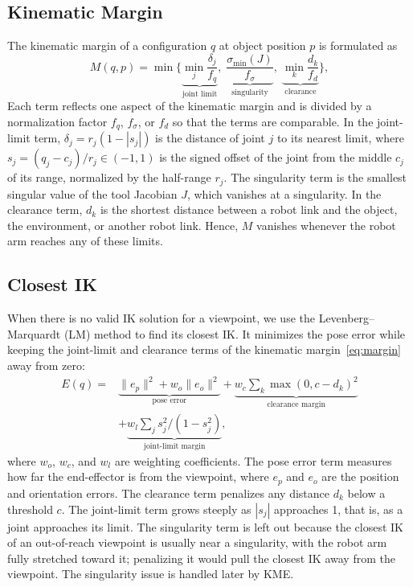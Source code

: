 \documentclass[letterpaper, journal, twoside]{IEEEtran}
\begin{document}
\subsection{Kinematic Margin}
\label{sec:margin}
The kinematic margin of a configuration $q$ at object position $p$ is formulated as
\begin{equation}
M(q, p) = \min\Big\{ \underbrace{\min_j \frac{\delta_j}{f_q}}_{\text{joint limit}},\; \underbrace{\frac{\sigma_{\min}(J)}{f_\sigma}}_{\text{singularity}},\; \underbrace{\min_k \frac{d_k}{f_d}}_{\text{clearance}} \Big\},
\label{eq:margin}
\end{equation}
Each term reflects one aspect of the kinematic margin and is divided by a normalization factor $f_q$, $f_\sigma$, or $f_d$ so that the terms are comparable. In the joint-limit term, $\delta_j = r_j(1 - |s_j|)$ is the distance of joint $j$ to its nearest limit, where $s_j = (q_j - c_j)/r_j \in (-1, 1)$ is the signed offset of the joint from the middle $c_j$ of its range, normalized by the half-range $r_j$. The singularity term is the smallest singular value of the tool Jacobian $J$, which vanishes at a singularity. In the clearance term, $d_k$ is the shortest distance between a robot link and the object, the environment, or another robot link. Hence, $M$ vanishes whenever the robot arm reaches any of these limits.

\subsection{Closest IK}
\label{sec:closest}
When there is no valid IK solution for a viewpoint, we use the Levenberg--Marquardt (LM) method to find its closest IK. It minimizes the pose error while keeping the joint-limit and clearance terms of the kinematic margin~\eqref{eq:margin} away from zero:
\begin{equation}
\begin{split}
E(q) = {}&\underbrace{\lVert e_p \rVert^2 + w_o \lVert e_o \rVert^2}_{\text{pose error}}
+ \underbrace{w_c \textstyle\sum_k \max(0, c - d_k)^2}_{\text{clearance margin}} \\
&+ \underbrace{w_l \textstyle\sum_j s_j^2 / (1 - s_j^2)}_{\text{joint-limit margin}},
\end{split}
\label{eq:closest}
\end{equation}
where $w_o$, $w_c$, and $w_l$ are weighting coefficients. The pose error term measures how far the end-effector is from the viewpoint, where $e_p$ and $e_o$ are the position and orientation errors. The clearance term penalizes any distance $d_k$ below a threshold $c$. The joint-limit term grows steeply as $|s_j|$ approaches 1, that is, as a joint approaches its limit. The singularity term is left out because the closest IK of an out-of-reach viewpoint is usually near a singularity, with the robot arm fully stretched toward it; penalizing it would pull the closest IK away from the viewpoint. The singularity issue is handled later by KME.
\end{document}
